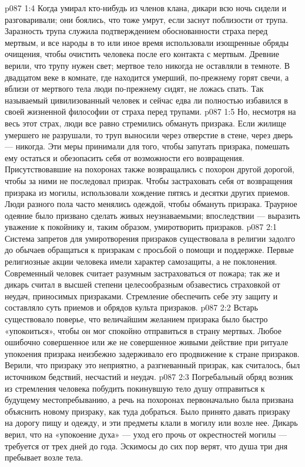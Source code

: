 \vs p087 1:4 Когда умирал кто\hyp{}нибудь из членов клана, дикари всю ночь сидели и разговаривали; они боялись, что тоже умрут, если заснут поблизости от трупа. Заразность трупа служила подтверждением обоснованности страха перед мертвым, и все народы в то или иное время использовали изощренные обряды очищения, чтобы очистить человека после его контакта с мертвым. Древние верили, что трупу нужен свет; мертвое тело никогда не оставляли в темноте. В двадцатом веке в комнате, где находится умерший, по\hyp{}прежнему горят свечи, а вблизи от мертвого тела люди по\hyp{}прежнему сидят, не ложась спать. Так называемый цивилизованный человек и сейчас едва ли полностью избавился в своей жизненной философии от страха перед трупами.
\vs p087 1:5 Но, несмотря на весь этот страх, люди все равно стремились обмануть призрака. Если жилище умершего не разрушали, то труп выносили через отверстие в стене, через дверь --- никогда. Эти меры принимали для того, чтобы запутать призрака, помешать ему остаться и обезопасить себя от возможности его возвращения. Присутствовавшие на похоронах также возвращались с похорон другой дорогой, чтобы за ними не последовал призрак. Чтобы застраховать себя от возвращения призрака из могилы, использовали хождение пятясь и десятки других приемов. Люди разного пола часто менялись одеждой, чтобы обмануть призрака. Траурное одеяние было призвано сделать живых неузнаваемыми; впоследствии --- выразить уважение к покойнику и, таким образом, умиротворить призраков.
\vs p087 2:1 Система запретов для умиротворения призраков существовала в религии задолго до обычаев обращаться к призракам с просьбой о помощи и поддержке. Первые религиозные акции человека имели характер самозащиты, а не поклонения. Современный человек считает разумным застраховаться от пожара; так же и дикарь считал в высшей степени целесообразным обзавестись страховкой от неудач, приносимых призраками. Стремление обеспечить себе эту защиту и составляло суть приемов и обрядов культа призраков.
\vs p087 2:2 \pc Встарь существовало поверье, что величайшим желанием призрака было быстро «упокоиться», чтобы он мог спокойно отправиться в страну мертвых. Любое ошибочно совершенное или же не совершенное живыми действие при ритуале упокоения призрака неизбежно задерживало его продвижение к стране призраков. Верили, что призраку это неприятно, а разгневанный призрак, как считалось, был источником бедствий, несчастий и неудач.
\vs p087 2:3 Погребальный обряд возник из стремления человека побудить покинувшую тело душу отправиться к будущему местопребыванию, а речь на похоронах первоначально была призвана объяснить новому призраку, как туда добраться. Было принято давать призраку на дорогу пищу и одежду, и эти предметы клали в могилу или возле нее. Дикарь верил, что на «упокоение духа» --- уход его прочь от окрестностей могилы --- требуется от трех дней до года. Эскимосы до сих пор верят, что душа три дня пребывает возле тела.

